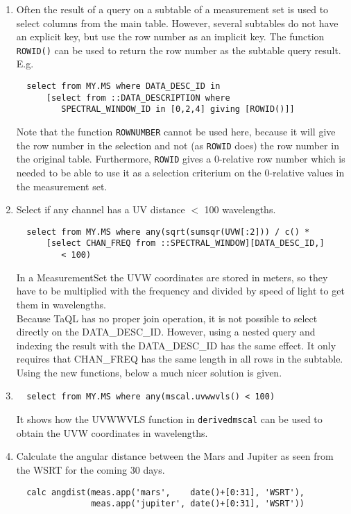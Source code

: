 \begin{enumerate}
\item
Often the result of a query on a subtable of a measurement set is
used to select columns from the main table. However, several
subtables do not have an explicit key, but use the row number as
an implicit key. The function \texttt{ROWID()} can be used to
return the row number as the subtable query result. E.g.
\begin{verbatim}
  select from MY.MS where DATA_DESC_ID in
      [select from ::DATA_DESCRIPTION where
         SPECTRAL_WINDOW_ID in [0,2,4] giving [ROWID()]] 
\end{verbatim}
Note that the function \texttt{ROWNUMBER} cannot be used here,
because it will give the row number in the selection and not
(as \texttt{ROWID} does) the row number in the original table.
Furthermore, \texttt{ROWID} gives a 0-relative row number which is
needed to be able to use it as a selection criterium on the 0-relative
values in the measurement set.

\item
Select if any channel has a UV distance $<$ 100 wavelengths.
\begin{verbatim}
  select from MY.MS where any(sqrt(sumsqr(UVW[:2])) / c() *
      [select CHAN_FREQ from ::SPECTRAL_WINDOW][DATA_DESC_ID,]
         < 100)
\end{verbatim}
In a MeasurementSet the UVW coordinates are stored in meters, so they
have to be multiplied with the frequency and divided by speed of light
to get them in wavelengths.
\\Because TaQL has no proper join operation, it is not possible to
select directly on the DATA\_DESC\_ID. However, using a nested query and
indexing the result with the DATA\_DESC\_ID has the same effect. It only
requires that CHAN\_FREQ has the same length in all rows in the
subtable.
\\Using the new  functions, below a
much nicer solution is given.

\item
\begin{verbatim}
  select from MY.MS where any(mscal.uvwwvls() < 100)
\end{verbatim}
It shows how the UVWWVLS function in {\tt derivedmscal} can be
used to obtain the UVW coordinates in wavelengths.

\item
Calculate the angular distance between the Mars and Jupiter as seen
from the WSRT for the coming 30 days.
\begin{verbatim}
  calc angdist(meas.app('mars',    date()+[0:31], 'WSRT'),
               meas.app('jupiter', date()+[0:31], 'WSRT'))
\end{verbatim}
\end{enumerate}


